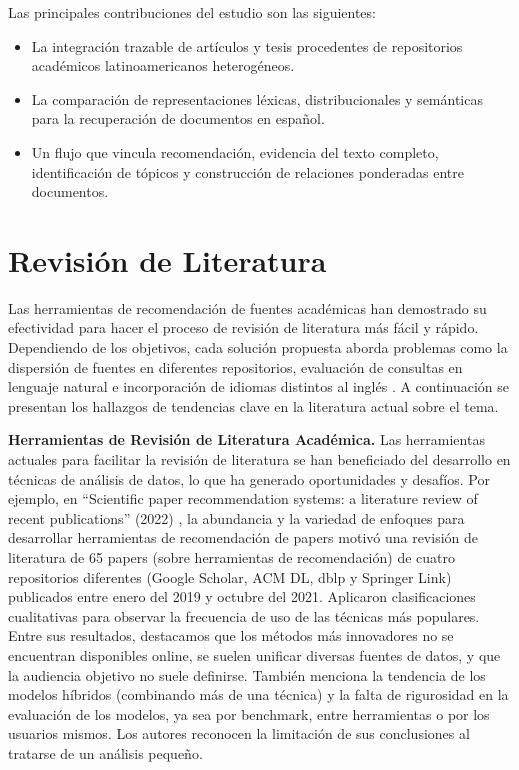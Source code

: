 \documentclass[conference]{IEEEtran}
\begin{document}
Las principales contribuciones del estudio son las siguientes:

\begin{itemize}
    \item La integración trazable de artículos y tesis procedentes de repositorios académicos latinoamericanos heterogéneos.
    \item La comparación de representaciones léxicas, distribucionales y semánticas para la recuperación de documentos en español.
    \item Un flujo que vincula recomendación, evidencia del texto completo, identificación de tópicos y construcción de relaciones ponderadas entre documentos.
\end{itemize}


\section{Revisión de Literatura}

Las herramientas de recomendación de fuentes académicas han demostrado su efectividad para hacer el proceso de revisión de literatura más fácil y rápido. Dependiendo de los objetivos, cada solución propuesta aborda problemas como la dispersión de fuentes en diferentes repositorios, evaluación de consultas en lenguaje natural e incorporación de idiomas distintos al inglés \cite{b1}. A continuación se presentan los hallazgos de tendencias clave en la literatura actual sobre el tema.

\textbf{Herramientas de Revisión de Literatura Académica.} Las herramientas actuales para facilitar la revisión de literatura se han beneficiado del desarrollo en técnicas de análisis de datos, lo que ha generado oportunidades y desafíos. Por ejemplo, en ``Scientific paper recommendation systems: a literature review of recent publications'' (2022) \cite{b1}, la abundancia y la variedad de enfoques para desarrollar herramientas de recomendación de papers motivó una revisión de literatura de 65 papers (sobre herramientas de recomendación) de cuatro repositorios diferentes (Google Scholar, ACM DL, dblp y Springer Link) publicados entre enero del 2019 y octubre del 2021. Aplicaron clasificaciones cualitativas para observar la frecuencia de uso de las técnicas más populares. Entre sus resultados, destacamos que los métodos más innovadores no se encuentran disponibles online, se suelen unificar diversas fuentes de datos, y que la audiencia objetivo no suele definirse. También menciona la tendencia de los modelos híbridos (combinando más de una técnica) y la falta de rigurosidad en la evaluación de los modelos, ya sea por benchmark, entre herramientas o por los usuarios mismos. Los autores reconocen la limitación de sus conclusiones al tratarse de un análisis pequeño.
\end{document}
